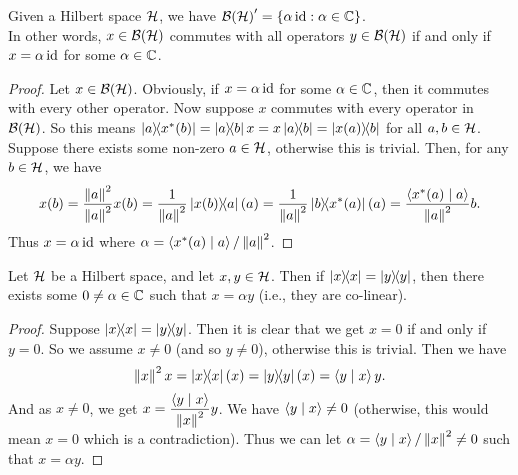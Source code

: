  \begin{lemma}\label{ContinuousLinearMap.centralizer}\leanok
  Given a Hilbert space $\mathcal{H}$, we have ${\mathcal{B}(\mathcal{H})}^\prime=\{\alpha\operatorname{id}:\alpha\in\mathbb{C}\}$.\\
  In other words, $x\in\mathcal{B}(\mathcal{H})$ commutes with all operators $y\in\mathcal{B}(\mathcal{H})$ if and only if $x=\alpha\operatorname{id}$ for some $\alpha\in\mathbb{C}$.
 \end{lemma}
 \begin{proof}\leanok
  Let $x\in\mathcal{B}(\mathcal{H})$. Obviously, if $x=\alpha\operatorname{id}$ for some $\alpha\in\mathbb{C}$, then it commutes with every other operator. Now suppose $x$ commutes with every operator in $\mathcal{B}(\mathcal{H})$.
  So this means $\ketbra{a}{x^*(b)}=\ketbra{a}{b}x=x\ketbra{a}{b}=\ketbra{x(a)}{b}$ for all $a,b\in\mathcal{H}$.
  Suppose there exists some non-zero $a\in\mathcal{H}$, otherwise this is trivial. Then, for any $b\in\mathcal{H}$, we have
  \[x(b)=\frac{\left\|a\right\|^2}{\left\|a\right\|^2}x(b)=\frac{1}{\left\|a\right\|^2}\left\lvert x(b)\right\rangle\!\!\left\langle a\right\rvert(a)=\frac{1}{\left\|a\right\|^2}\left\lvert b\right\rangle\!\!\left\langle x^*(a)\right\rvert(a)=\frac{\left\langle x^*(a) \mid a\right\rangle}{\left\|a\right\|^2}b.\]
  Thus $x=\alpha\operatorname{id}$ where $\alpha=\left\langle x^*(a) \mid a\right\rangle/\left\|a\right\|^2$.
 \end{proof}

 \begin{proposition}\label{colinear_of_rankOne_self_eq_rankOne_self}\leanok
  Let $\mathcal{H}$ be a Hilbert space, and let $x,y\in\mathcal{H}$. Then if $\left\lvert x\right\rangle\!\!\left\langle x\right\rvert=\left\lvert y\right\rangle\!\!\left\langle y\right\rvert$, then there exists some $0\neq\alpha\in\mathbb{C}$ such that $x=\alpha{y}$ (i.e., they are co-linear).
 \end{proposition}
 \begin{proof}\leanok
  Suppose $\left\lvert x\right\rangle\!\!\left\langle x\right\rvert=\left\lvert y\right\rangle\!\!\left\langle y\right\rvert$. Then it is clear that we get $x=0$ if and only if $y=0$. So we assume $x\neq0$ (and so $y\neq0$), otherwise this is trivial.
  Then we have \[\left\|x\right\|^2x=\left\lvert x\right\rangle\!\!\left\langle x\right\rvert(x)=\left\lvert y\right\rangle\!\!\left\langle y\right\rvert(x)=\left\langle y \mid x\right\rangle y.\]
  And as $x\neq0$, we get $x=\dfrac{\left\langle y \mid x\right\rangle}{\left\|x\right\|^2}y$. We have $\left\langle y \mid x\right\rangle\neq0$ (otherwise, this would mean $x=0$ which is a contradiction). Thus we can let $\alpha=\left\langle y \mid x\right\rangle/\left\|x\right\|^2\neq0$ such that $x=\alpha{y}$.
 \end{proof}


